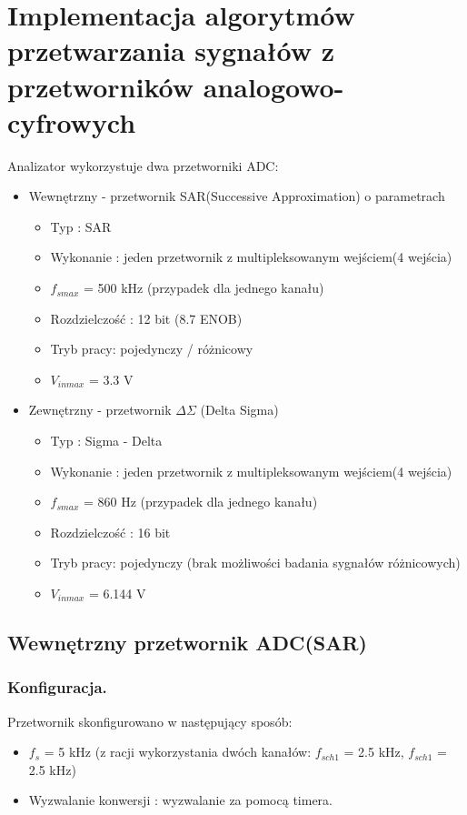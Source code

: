 \section{Implementacja algorytmów przetwarzania sygnałów z przetworników analogowo-cyfrowych}
Analizator wykorzystuje dwa przetworniki ADC:
\begin{itemize}
    \item Wewnętrzny - przetwornik SAR(Successive Approximation) o parametrach
        \begin{itemize}
            \item Typ : SAR
            \item Wykonanie : jeden przetwornik z multipleksowanym wejściem(4 wejścia) 
            \item $f_{smax}$ = 500 kHz (przypadek dla jednego kanału)
            \item Rozdzielczość : 12 bit (8.7 ENOB)
            \item Tryb pracy: pojedynczy / różnicowy
            \item $V_{inmax}$ = 3.3 V
        \end{itemize}
        
    \item Zewnętrzny - przetwornik $\Delta\Sigma$ (Delta Sigma)
        \begin{itemize}
            \item Typ : Sigma - Delta
            \item Wykonanie : jeden przetwornik z multipleksowanym wejściem(4 wejścia) 
            \item $f_{smax}$ = 860 Hz (przypadek dla jednego kanału)
            \item Rozdzielczość : 16 bit 
            \item Tryb pracy: pojedynczy (brak możliwości badania sygnałów różnicowych) 
            \item $V_{inmax}$ = 6.144 V
        \end{itemize}
\end{itemize}

\subsection{Wewnętrzny przetwornik ADC(SAR)}
\subsubsection{Konfiguracja.}
Przetwornik skonfigurowano w następujący sposób:
    \begin{itemize}
        \item $f_{s}$ = 5 kHz (z racji wykorzystania dwóch kanałów: $f_{sch1}$ = 2.5 kHz, $f_{sch1}$ = 2.5 kHz)
        \item Wyzwalanie konwersji : wyzwalanie za pomocą timera. 
    \end{itemize}

